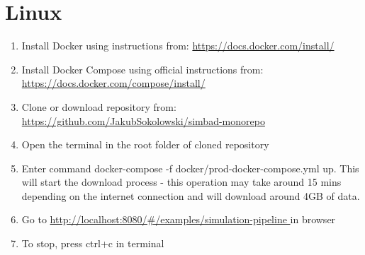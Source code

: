 \section{Linux}
\begin{enumerate}
    \item Install Docker using instructions from: \newline
    \url{https://docs.docker.com/install/}
    \item Install Docker Compose using official instructions from: \newline
    \url{https://docs.docker.com/compose/install/}
    \item Clone or download repository from: \newline
    \url{https://github.com/JakubSokolowski/simbad-monorepo}
    \item Open the terminal in the root folder of cloned repository
    \item Enter command docker-compose -f docker/prod-docker-compose.yml up. This will start the download process - this operation may take around 15 mins depending on the internet connection and will download around 4GB of data.
    \item Go to \url{http://localhost:8080/\#/examples/simulation-pipeline } in browser
    \item To stop, press ctrl+c in terminal
\end{enumerate}